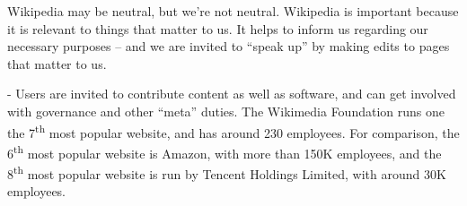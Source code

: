 %
%
Wikipedia may be neutral, but we're not neutral.
%
%
%
Wikipedia is important because it is relevant to things that matter to
us.  It helps to inform us regarding our necessary purposes -- and we
are invited to ``speak up'' by making edits to pages that matter to
us.
%

 - Users are invited to contribute content as
well as software, and can get involved with governance and other
``meta'' duties.  The Wikimedia Foundation runs one the
7\textsuperscript{th} most popular website, and has around 230
employees.  For comparison, the 6\textsuperscript{th} most popular
website is Amazon, with more than 150K employees, and the
8\textsuperscript{th} most popular website is run by Tencent Holdings
Limited, with around 30K employees.

